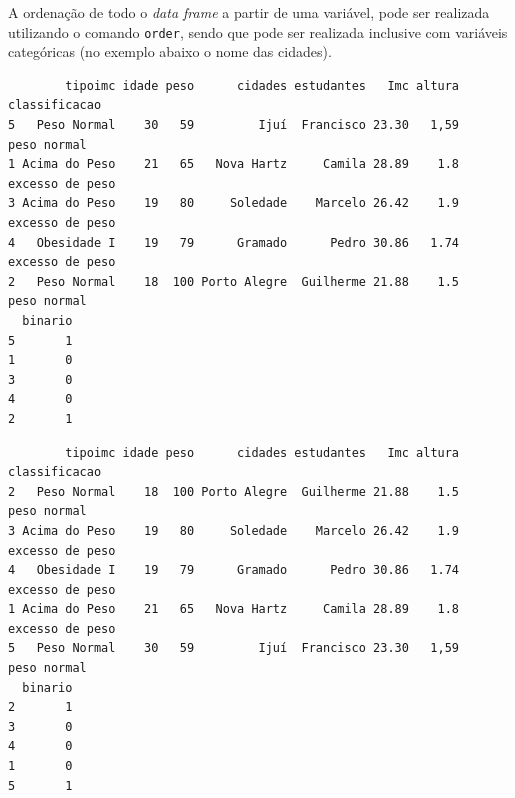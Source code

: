 \documentclass[12pt,brazil,]{book}
\newenvironment{Shaded}{\begin{snugshade}}{\end{snugshade}}
\newcommand{\CommentTok}[1]{\textcolor[rgb]{0.56,0.35,0.01}{\textit{#1}}}
\newcommand{\DataTypeTok}[1]{\textcolor[rgb]{0.13,0.29,0.53}{#1}}
\newcommand{\KeywordTok}[1]{\textcolor[rgb]{0.13,0.29,0.53}{\textbf{#1}}}
\newcommand{\NormalTok}[1]{#1}
\newcommand{\OperatorTok}[1]{\textcolor[rgb]{0.81,0.36,0.00}{\textbf{#1}}}
\newcommand{\OtherTok}[1]{\textcolor[rgb]{0.56,0.35,0.01}{#1}}
\begin{document}
A ordenação de todo o \emph{data frame} a partir de uma variável, pode
ser realizada utilizando o comando \texttt{order}, sendo que pode ser
realizada inclusive com variáveis categóricas (no exemplo abaixo o nome
das cidades).

\begin{Shaded}
\end{Shaded}

\begin{verbatim}
        tipoimc idade peso      cidades estudantes   Imc altura   classificacao
5   Peso Normal    30   59         Ijuí  Francisco 23.30   1,59     peso normal
1 Acima do Peso    21   65   Nova Hartz     Camila 28.89    1.8 excesso de peso
3 Acima do Peso    19   80     Soledade    Marcelo 26.42    1.9 excesso de peso
4   Obesidade I    19   79      Gramado      Pedro 30.86   1.74 excesso de peso
2   Peso Normal    18  100 Porto Alegre  Guilherme 21.88    1.5     peso normal
  binario
5       1
1       0
3       0
4       0
2       1
\end{verbatim}

\begin{Shaded}
\end{Shaded}

\begin{verbatim}
        tipoimc idade peso      cidades estudantes   Imc altura   classificacao
2   Peso Normal    18  100 Porto Alegre  Guilherme 21.88    1.5     peso normal
3 Acima do Peso    19   80     Soledade    Marcelo 26.42    1.9 excesso de peso
4   Obesidade I    19   79      Gramado      Pedro 30.86   1.74 excesso de peso
1 Acima do Peso    21   65   Nova Hartz     Camila 28.89    1.8 excesso de peso
5   Peso Normal    30   59         Ijuí  Francisco 23.30   1,59     peso normal
  binario
2       1
3       0
4       0
1       0
5       1
\end{verbatim}

\begin{Shaded}
\end{Shaded}
\end{document}
